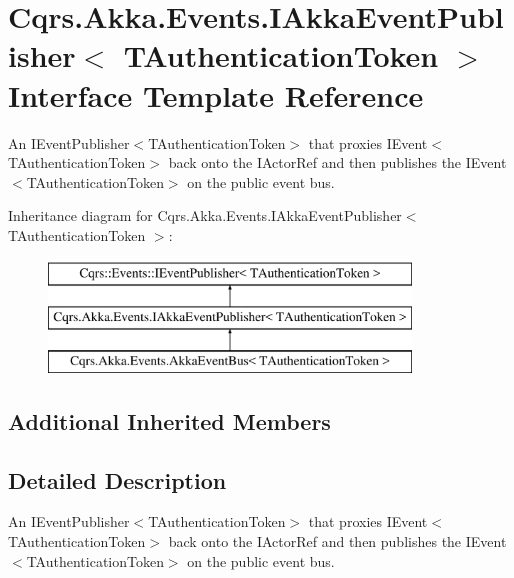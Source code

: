 \hypertarget{interfaceCqrs_1_1Akka_1_1Events_1_1IAkkaEventPublisher}{}\section{Cqrs.\+Akka.\+Events.\+I\+Akka\+Event\+Publisher$<$ T\+Authentication\+Token $>$ Interface Template Reference}
\label{interfaceCqrs_1_1Akka_1_1Events_1_1IAkkaEventPublisher}


An I\+Event\+Publisher$<$\+T\+Authentication\+Token$>$ that proxies I\+Event$<$\+T\+Authentication\+Token$>$ back onto the I\+Actor\+Ref and then publishes the I\+Event$<$\+T\+Authentication\+Token$>$ on the public event bus.  


Inheritance diagram for Cqrs.\+Akka.\+Events.\+I\+Akka\+Event\+Publisher$<$ T\+Authentication\+Token $>$\+:\begin{figure}[H]
\begin{center}
\leavevmode
\includegraphics[height=3.000000cm]{interfaceCqrs_1_1Akka_1_1Events_1_1IAkkaEventPublisher}
\end{center}
\end{figure}
\subsection*{Additional Inherited Members}


\subsection{Detailed Description}
An I\+Event\+Publisher$<$\+T\+Authentication\+Token$>$ that proxies I\+Event$<$\+T\+Authentication\+Token$>$ back onto the I\+Actor\+Ref and then publishes the I\+Event$<$\+T\+Authentication\+Token$>$ on the public event bus. 

